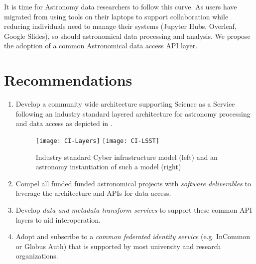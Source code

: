 It is time for Astronomy data researchers to follow this curve. As users have migrated
from using tools on their laptops to support collaboration while reducing
individuals need to manage their systems (Jupyter Hubs, Overleaf, Google Slides),
so should astronomical data processing and analysis. We propose the adoption of
a common Astronomical data access \gls{API} layer.


\section{Recommendations }
\begin{enumerate}
 \item Develop a community wide architecture supporting Science as a Service following
	an industry  standard layered architecture for astronomy processing and data access as
depicted in .


\begin{figure}
\centering
\texttt{[image: CI-Layers]}
\texttt{[image: CI-LSST]}
\caption{Industry standard Cyber infrastructure model (left) and an astronomy instantiation of such a model (right)\label{fig:ci}}
\end{figure}

\item Compel all funded funded astronomical projects with \emph{software deliverables} to  leverage the architecture and  APIs for data access.

\item Develop \emph{data and \gls{metadata} transform services}
to support these common \gls{API} layers to aid interoperation.

\item Adopt and subscribe to a \emph{common federated identity service} (e.g. InCommon or
Globus Auth) that is supported by most university and research organizations.
\end{enumerate}




